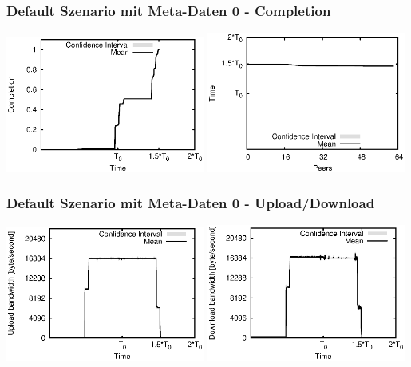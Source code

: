 \begin{frame}
  \frametitle{Default Szenario mit Meta-Daten 0 - Completion}
  \begin{center}
    \includegraphics[width=0.49\textwidth]{fig/plots/scenario_5_meta_data_0/plots/GeneratedMeanChunkCompletion.csv.eps}
    \hfill
    \includegraphics[width=0.49\textwidth]{fig/plots/scenario_5_meta_data_0/plots/GeneratedMeanSortedChunkCompletion.csv.eps}
  \end{center}
\end{frame}


\begin{frame}
  \frametitle{Default Szenario mit Meta-Daten 0 - Upload/Download}
  \begin{center}
    \includegraphics[width=0.49\textwidth]{fig/plots/scenario_5_meta_data_0/plots/GeneratedMeanCurrentUploadBandwidth.csv.eps}
    \includegraphics[width=0.49\textwidth]{fig/plots/scenario_5_meta_data_0/plots/GeneratedMeanCurrentDownloadBandwidth.csv.eps}
  \end{center}
\end{frame}


